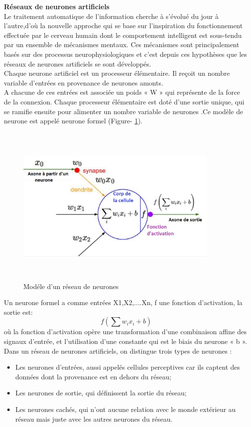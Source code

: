 {\textbf{Réseaux de neurones artificiels }}\\

Le traitement automatique de l’information cherche à s’évolué du jour à l’autre,d’où la nouvelle approche qui se base sur l’inspiration du fonctionnement effectuée par le  cerveau humain dont le comportement intelligent est sous-tendu par un ensemble de mécanismes mentaux. Ces mécanismes sont principalement basés sur des processus neurophysiologiques et c’est depuis ces hypothèses que les réseaux de neurones artificiels se sont développés.\\ 
Chaque neurone artificiel est un processeur élémentaire. Il reçoit un nombre variable d'entrées en provenance de neurones amonts.\\

A chacune de ces entrées est associée un poids « W » qui représente de la force de la connexion. Chaque processeur élémentaire est doté d'une sortie unique, qui se ramifie ensuite pour alimenter un nombre variable de neurones .Ce modèle de neurone est appelé neurone formel (Figure- \ref{fig:mod}).

\begin{figure}[h!]
      \centering
      \includegraphics[width=10cm,height=8cm]{images/model.png}
    \caption{Modéle d'un réseau de neurones}
    \label{fig:mod}
\end{figure}

Un neurone formel a comme entrées  X1,X2,....Xn, f une fonction d’activation, la sortie est: \[f(\sum w_i x_i + b)\] où la fonction d’activation opère une transformation d’une combinaison affine des signaux d’entrée, et l’utilisation d’une constante qui est le biais du neurone « b ».\\
Dans un réseau de neurones artificiels, on distingue trois types de neurones \cite{37}:
\begin{itemize}
    \item Les neurones d’entrées, aussi appelés cellules perceptives car ils captent des données dont la provenance est en dehors du réseau;
    \item Les neurones de sortie, qui définissent la sortie du réseau;
    \item Les neurones cachés, qui n’ont aucune relation avec le monde extérieur au réseau mais juste avec les autres neurones du réseau. 
    
\end{itemize}

